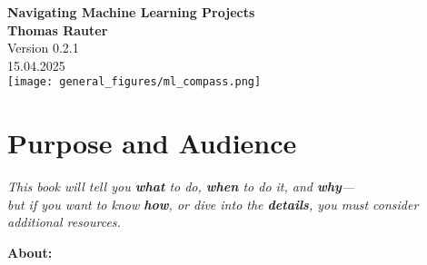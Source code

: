\documentclass[12pt,openany, draft]{book}
\begin{document}
\begin{titlepage}
    \centering
    \newpage
    \thispagestyle{empty}
    
    
    \vspace*{2cm}
    {\LARGE \textbf{\textcolor{darknavy}{Navigating Machine Learning Projects}}} \\

    
    \vspace{2cm}  %
    \Large{\textcolor{darknavy}{\textbf{Thomas Rauter}}} \\
    
    \vspace{0.5cm}
    \large{\textcolor{darknavy}{Version 0.2.1}} \\
    \large{\textcolor{darknavy}{15.04.2025}} \\
    
    \vspace{1.5cm}
    \texttt{[image: general\_figures/ml\_compass.png]} \\
    
\end{titlepage}


\setcounter{tocdepth}{1}

\tableofcontents

\newpage

\section{Purpose and Audience}

\begin{center}
\textit{This book will tell you \textcolor{green!50!black}{\textbf{what}} to do, \textcolor{green!50!black}{\textbf{when}} to do it, and \textcolor{green!50!black}{\textbf{why}}—\\
but if you want to know \textcolor{red!70!black}{\textbf{how}}, or dive into the \textcolor{red!70!black}{\textbf{details}}, you must consider additional resources.}
\end{center}

\vspace{1em}
\textbf{About:}
\end{document}
